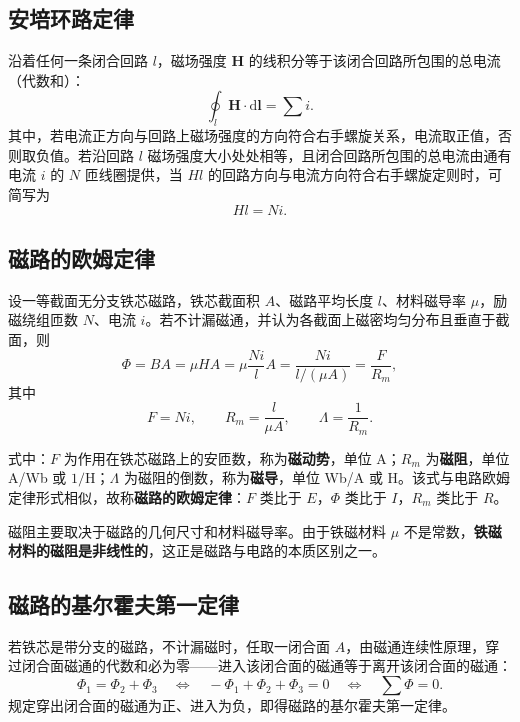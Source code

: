 \subsection{安培环路定律}
沿着任何一条闭合回路 $l$，磁场强度 $\boldsymbol{H}$ 的线积分等于该闭合回路所包围的总电流（代数和）：
\begin{equation}
\oint_{l}\boldsymbol{H}\cdot \mathrm{d}\boldsymbol{l}=\sum i .
\end{equation}
其中，若电流正方向与回路上磁场强度的方向符合右手螺旋关系，电流取正值，否则取负值。若沿回路 $l$ 磁场强度大小处处相等，且闭合回路所包围的总电流由通有电流 $i$ 的 $N$ 匝线圈提供，当 $Hl$ 的回路方向与电流方向符合右手螺旋定则时，可简写为
\begin{equation}
Hl=Ni .
\end{equation}

\subsection{磁路的欧姆定律}
设一等截面无分支铁芯磁路，铁芯截面积 $A$、磁路平均长度 $l$、材料磁导率 $\mu$，励磁绕组匝数 $N$、电流 $i$。若不计漏磁通，并认为各截面上磁密均匀分布且垂直于截面，则
\begin{equation}
\Phi=BA=\mu H A=\mu\frac{Ni}{l}A=\frac{Ni}{l/(\mu A)}=\frac{F}{R_m},
\end{equation}
其中
\begin{equation}
F=Ni,\qquad R_m=\frac{l}{\mu A},\qquad \Lambda=\frac{1}{R_m}.
\end{equation}


式中：$F$ 为作用在铁芯磁路上的安匝数，称为\textbf{磁动势}，单位 A；$R_m$ 为\textbf{磁阻}，单位 A/Wb 或 $1/\mathrm{H}$；$\Lambda$ 为磁阻的倒数，称为\textbf{磁导}，单位 Wb/A 或 H。该式与电路欧姆定律形式相似，故称\textbf{磁路的欧姆定律}：$F$ 类比于 $E$，$\Phi$ 类比于 $I$，$R_m$ 类比于 $R$。

磁阻主要取决于磁路的几何尺寸和材料磁导率。由于铁磁材料 $\mu$ 不是常数，\textbf{铁磁材料的磁阻是非线性的}，这正是磁路与电路的本质区别之一。

\subsection{磁路的基尔霍夫第一定律}
若铁芯是带分支的磁路，不计漏磁时，任取一闭合面 $A$，由磁通连续性原理，穿过闭合面磁通的代数和必为零——进入该闭合面的磁通等于离开该闭合面的磁通：
\begin{equation}
\Phi_1=\Phi_2+\Phi_3
\quad\Longleftrightarrow\quad
-\Phi_1+\Phi_2+\Phi_3=0
\quad\Longleftrightarrow\quad
\sum\Phi=0 .
\end{equation}
规定穿出闭合面的磁通为正、进入为负，即得磁路的基尔霍夫第一定律。

